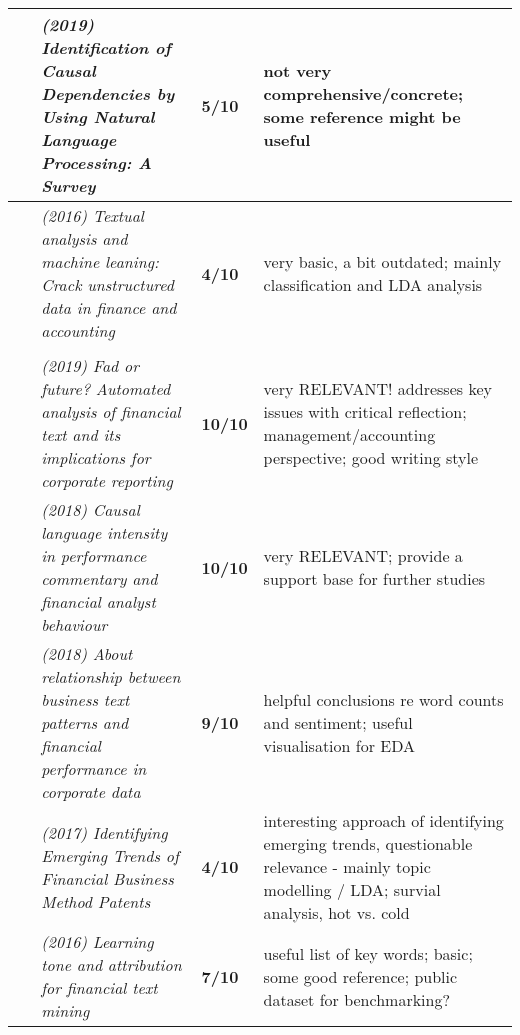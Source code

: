 \documentclass[10pt]{article}
\begin{document}
\begin{landscape}
\begin{longtable}{ |m{2em}|m{28em}|m{3em}|m{24em}| }
~\cite{2019_survey_causaldependencies} &\emph{(2019) Identification of Causal Dependencies by Using Natural Language Processing: A Survey}
& \textbf{5/10} & not very comprehensive/concrete; some reference might be useful\\
 \hline

~\cite{2016_survey} & \emph{(2016) Textual analysis and machine leaning: Crack unstructured data in finance and accounting}
& \textbf{4/10} & very basic, a bit outdated; mainly classification and LDA analysis\\
 \hline

\rowcolor{lightgray}\multicolumn{4}{|l|}{Support} \\
 \hline 
~\cite{2019_FadorFuture} &\emph{(2019) Fad or future? Automated analysis of financial text and its implications for corporate reporting}
& \textbf{10/10} & very RELEVANT! addresses key issues with critical reflection; management/accounting perspective; good writing style\\
 \hline

~\cite{2018_causal_finan} &\emph{(2018) Causal language intensity in performance commentary and financial analyst behaviour}
& \textbf{10/10} & very RELEVANT; provide a support base for further studies\\
 \hline

~\cite{2018_financialPerformance} & \emph{(2018) About relationship between business text patterns and financial performance in corporate data}
& \textbf{9/10} & helpful conclusions re word counts and sentiment; useful visualisation for EDA\\
 \hline

~\cite{2017_identifyTrends} & \emph{(2017) Identifying Emerging Trends of Financial Business Method Patents}
& \textbf{4/10} & interesting approach of identifying emerging trends, questionable relevance - mainly topic modelling / LDA; survial analysis, hot vs. cold \\
 \hline

~\cite{2016_attribution} & \emph{(2016) Learning tone and attribution for financial text mining}
& \textbf{7/10} & useful list of key words; basic; some good reference; public dataset for benchmarking?\\
 \hline


\end{longtable}
\end{landscape}
\end{document}
